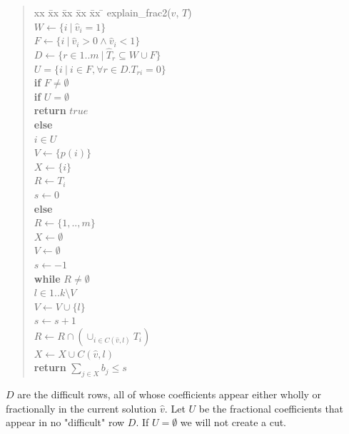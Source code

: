 \documentclass{article}
\begin{document}
\begin{quote} 
\begin{tabbing}
    xx \= xx \= xx \= xx \= xx \= \kill
    \textsf{explain\_frac2}($\hat{v}$, $T$) \\
    \> $W \gets \{ i ~|~ \hat{v}_i = 1 \}$ \\
    \> $F \gets \{ i ~|~ \hat{v}_i > 0 \wedge \hat{v}_i < 1 \}$ \\
\> $D \gets \{ r \in 1..m ~|~ \hat{T}_r \subseteq W \cup F\}$ \\
    \> $U = \{ i ~|~ i \in F, \forall r \in D.T_{ri} = 0\}$ \\
    \> \textbf{if} $F \neq \emptyset$ \\
    \> \> \textbf{if} $U = \emptyset$ \\
    \> \> \> \textbf{return} $true$ \\
    \> \> \textbf{else} \\
    \> \> \>  $i \in U$ \\
    \> \> \> $V \gets \{ p(i) \}$ \\
    \> \> \> $X \gets \{ i \}$ \\
    \> \> \> $R \gets T_i$ \\
    \> \> \> $s \gets 0$ \\
    \> \textbf{else} \\
    \> \> $R \gets \{1, .., m\}$ \\
    \> \> $X \gets \emptyset$ \\
    \> \> $V \gets \emptyset$ \\
    \> \> $s \gets -1$ \\
    \> \textbf{while} $R \neq \emptyset$ \\
    \> \>  $l \in 1..k \setminus V$ \\
    \> \> $V \gets V \cup \{l\}$ \\
    \> \> $s \gets s + 1$ \\
    \> \> $R \gets R \cap (\cup_{i \in C(\hat{v},l)} T_i)$ \\
    \> \> $X \gets X \cup C(\hat{v},l)$ \\
    \> \textbf{return} $\sum_{j \in X} b_j \leq s$
\end{tabbing}
\end{quote}

$D$ are the difficult rows, all of whose  coefficients appear either wholly or 
fractionally in the current solution $\hat{v}$. 
Let $U$ be the fractional coefficients that appear in no "difficult" row $D$. If $U = \emptyset$ we will not create a cut. 
\end{document}
